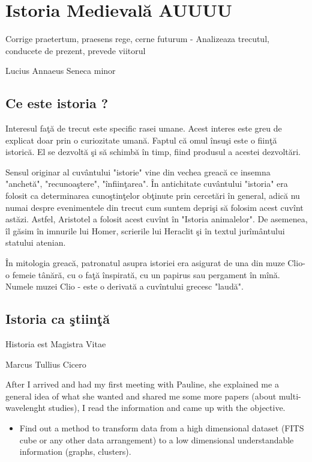 
\chapter{Istoria Medievală AUUUU}
\epigraph{Corrige praetertum, praesens rege, cerne futurum - Analizeaza trecutul, conducete de prezent, prevede viitorul }{Lucius Annaeus Seneca minor}
\section{Ce este istoria ?}

Interesul faţă de trecut este specific rasei umane. Acest interes este greu de explicat doar prin o curiozitate umană. Faptul că omul însuşi  este o fiinţă istorică.  El se dezvoltă şi să schimbă în timp, fiind produsul a acestei dezvoltări.

Sensul originar al cuvântului "istorie" vine din vechea  greacă  ce insemna "anchetă", "recunoaştere", "înfiinţarea". În antichitate cuvântului "istoria" era folosit ca determinarea cunoştinţelor obţinute prin cercetări în general, adică nu numai despre evenimentele din trecut cum suntem deprişi să folosim acest cuvînt astăzi. Astfel, Aristotel a folosit acest cuvînt în "Istoria animalelor". De asemenea, îl găsim în imnurile lui Homer, scrierile lui Heraclit şi în textul jurîmântului statului atenian.



În mitologia greacă, patronatul asupra istoriei era asigurat de una din muze Clio- o femeie tânără, cu o faţă înspirată, cu un papirus sau pergament în mînă. Numele  muzei Clio - este o derivată  a cuvîntului  grecesc "laudă".



\section{Istoria ca ştiinţă}
\epigraph{Historia est Magistra Vitae}{Marcus Tullius Cicero}
After I arrived and had my first meeting with Pauline, she explained me a general idea of what she wanted and shared me some more papers (about multi-wavelenght studies), I read the information and came up with the objective.

\begin{itemize}
\item Find out a method to transform data from a high dimensional dataset (FITS cube or any other data arrangement) to a low dimensional understandable information (graphs, clusters).
\end{itemize}

